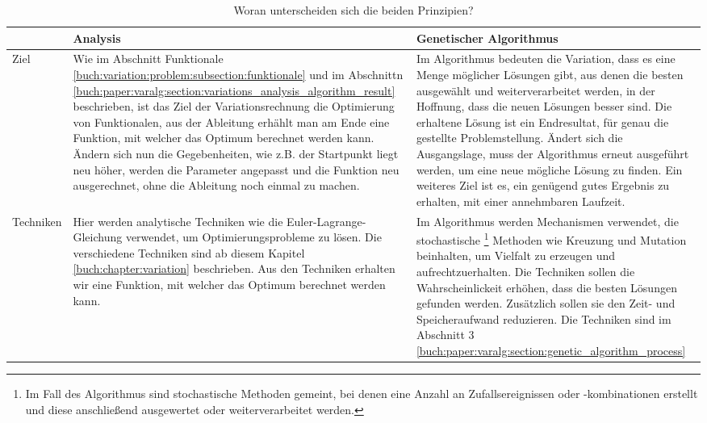 \begin{table}
   \centering
   \caption{Woran unterscheiden sich die beiden Prinzipien?}
   \begin{tabularx}{\textwidth}{|L|X|X|}
      \hline
       & Analysis 
       & Genetischer Algorithmus 
       \\ \hline
      Ziel
       & Wie im Abschnitt Funktionale \ref{buch:variation:problem:subsection:funktionale} und
       im Abschnittn \ref{buch:paper:varalg:section:variations_analysis_algorithm_result}
      beschrieben, ist das Ziel der Variationsrechnung die Optimierung von Funktionalen, aus der
      Ableitung erhählt man am Ende eine Funktion, mit welcher das Optimum berechnet werden kann. 
      Ändern sich nun die Gegebenheiten, wie z.B. der Startpunkt liegt neu höher, werden die Parameter 
      angepasst und die Funktion neu ausgerechnet, ohne die Ableitung noch einmal zu machen.
       & Im Algorithmus bedeuten die Variation, dass es eine Menge möglicher Lösungen gibt, 
      aus denen die besten ausgewählt und weiterverarbeitet werden, in der 
      Hoffnung, dass die neuen Lösungen besser sind. Die erhaltene Lösung ist ein Endresultat, für
      genau die gestellte Problemstellung. Ändert sich die Ausgangslage, muss der Algorithmus
      erneut ausgeführt werden, um eine neue mögliche Lösung zu finden. Ein weiteres Ziel ist es,
      ein genügend gutes Ergebnis zu erhalten, mit einer annehmbaren Laufzeit.
      \\ \hline
      Techniken  
       & Hier werden analytische Techniken wie die Euler-Lagrange-Gleichung verwendet, 
      um Optimierungsprobleme zu lösen. Die verschiedene Techniken sind ab diesem Kapitel
      \ref{buch:chapter:variation} beschrieben. Aus den Techniken erhalten wir eine Funktion,
      mit welcher das Optimum berechnet werden kann.
       & Im Algorithmus werden Mechanismen verwendet, die stochastische
      \footnote{
         Im Fall des Algorithmus sind stochastische Methoden gemeint, bei denen 
         eine Anzahl an Zufallsereignissen oder -kombinationen erstellt und 
         diese anschließend ausgewertet oder weiterverarbeitet werden.
      }
      Methoden wie Kreuzung und Mutation beinhalten, um Vielfalt zu erzeugen und aufrechtzuerhalten.
      Die Techniken sollen die Wahrscheinlickeit erhöhen, dass die besten Lösungen gefunden werden.
      Zusätzlich sollen sie den Zeit- und Speicheraufwand reduzieren.
      Die Techniken sind im Abschnitt 3 \ref{buch:paper:varalg:section:genetic_algorithm_process}
      \\ \hline

\end{tabularx}
\end{table}

